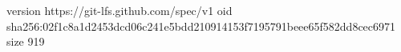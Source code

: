 version https://git-lfs.github.com/spec/v1
oid sha256:02f1c8a1d2453dcd06c241e5bdd210914153f7195791beee65f582dd8cec6971
size 919

